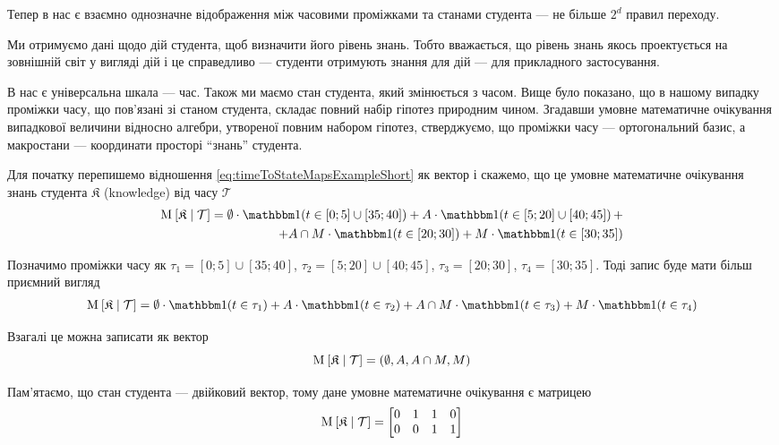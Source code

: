 Тепер в нас є взаємно однозначне відображення між часовими проміжками та
станами студента --- не більше $2^d$ правил переходу.

Ми отримуємо дані щодо дій студента, щоб визначити його рівень знань.
Тобто вважається, що рівень знань якось проектується на зовнішній світ у
вигляді дій і це справедливо --- студенти отримують знання для дій --- для
прикладного застосування.

В нас є універсальна шкала --- час.
Також ми маємо стан студента, який змінюється з часом.
Вище було показано, що в нашому випадку проміжки часу, що пов’язані зі станом
студента, складає повний набір гіпотез природним чином.
Згадавши умовне математичне очікування випадкової величини відносно алгебри,
утвореної повним набором гіпотез, стверджуємо, що проміжки часу ---
ортогональний базис, а макростани --- координати просторі ``знань'' студента.

Для початку перепишемо відношення \eqref{eq:timeToStateMapsExampleShort} як
вектор і скажемо, що це умовне математичне очікування знань студента
$\mathfrak{K}$ (knowledge) від часу $\mathcal{T}$
\begin{align*}
  \Mean{\mathfrak{K} \mcond \mathcal{T}} =
    \emptyset \cdot
      \indicator{t \in \left[ 0; 5 \right] \cup \left[ 35; 40 \right]}
    + A \cdot
      \indicator{t \in \left[ 5; 20 \right] \cup \left[ 40; 45 \right]} + \\
    + A \cap M \cdot \indicator{t \in \left[ 20; 30 \right]}
    + M \cdot \indicator{t \in \left[ 30; 35 \right]}
\end{align*}

Позначимо проміжки часу як
$\tau_1 = \left[ 0; 5 \right] \cup \left[ 35; 40 \right]$,
$\tau_2 = \left[ 5; 20 \right] \cup \left[ 40; 45 \right]$,
$\tau_3 = \left[ 20; 30 \right]$,
$\tau_4 = \left[ 30; 35 \right]$.
Тоді запис буде мати більш приємний вигляд
\begin{align*}
  \Mean{\mathfrak{K} \mcond \mathcal{T}} =
  \emptyset \cdot \indicator{t \in \tau_1} + A \cdot \indicator{t \in \tau_2}
  + A \cap M \cdot \indicator{t \in \tau_3} + M \cdot \indicator{t \in \tau_4}
\end{align*}

Взагалі це можна записати як вектор
\begin{equation*}
  \operatorname{M}_{} \left[ \mathfrak{K} \;\middle|\; \mathcal{T} \right] =
  \left( \emptyset, A, A \cap M, M \right)
\end{equation*}

Пам’ятаємо, що стан студента --- двійковий вектор, тому дане умовне математичне
очікування є матрицею
\begin{equation*}
  \operatorname{M}_{} \left[ \mathfrak{K} \;\middle|\; \mathcal{T} \right] =
  \begin{bmatrix}
    0 & 1 & 1 & 0 \\
    0 & 0 & 1 & 1
  \end{bmatrix}
\end{equation*}

